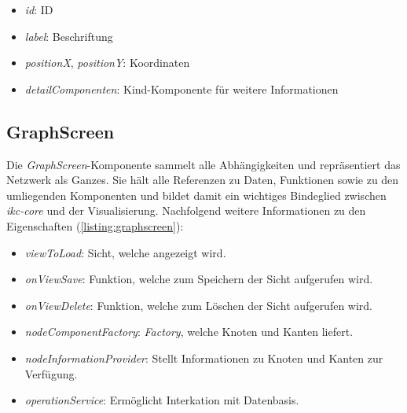 \begin{itemize}
    \item \textit{id}: ID
    \item \textit{label}: Beschriftung
    \item \textit{positionX}, \textit{positionY}: Koordinaten
    \item \textit{detailComponenten}: Kind-Komponente für weitere Informationen
\end{itemize}


\subsection{GraphScreen}
Die \textit{GraphScreen}-Komponente sammelt alle Abhängigkeiten und repräsentiert das Netzwerk als Ganzes. Sie hält alle Referenzen zu Daten, Funktionen sowie zu den umliegenden Komponenten und bildet damit ein wichtiges Bindeglied zwischen \textit{ikc-core} und der Visualisierung. Nachfolgend weitere Informationen zu den Eigenschaften (\autoref{listing:graphscreen}):

\begin{itemize}
    \item \textit{viewToLoad}: Sicht, welche angezeigt wird.
    \item \textit{onViewSave}: Funktion, welche zum Speichern der Sicht aufgerufen wird.
    \item \textit{onViewDelete}: Funktion, welche zum Löschen der Sicht aufgerufen wird.
    \item \textit{nodeComponentFactory}: \textit{Factory}, welche Knoten und Kanten liefert.
    \item \textit{nodeInformationProvider}: Stellt Informationen zu Knoten und Kanten zur Verfügung.
    \item \textit{operationService}: Ermöglicht Interkation mit Datenbasis.
\end{itemize}


